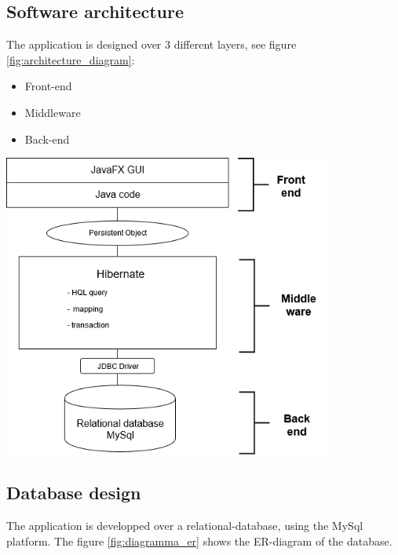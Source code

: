 \documentclass[a4paper, oneside]{article}
\begin{document}
\subsection{Software architecture}
The application is designed over 3 different layers, see figure \ref{fig:architecture_diagram}:
\begin{itemize}
\item Front-end
\item Middleware
\item Back-end
\end{itemize}
\vspace{5mm}
\begin{minipage}{\linewidth}
\begin{center}
\vspace{1mm}
\includegraphics[height = 100mm]{./images/diagrams/architecture_diagram.png} 
\vspace{6mm}
\label{fig:architecture_diagram}
\end{center}
\end{minipage}
\vspace{5mm}

\clearpage
\subsection{Database design}
The application is developped over a relational-database, using the MySql platform. The figure \ref{fig:diagramma_er} shows the ER-diagram of the database.\\
\end{document}
